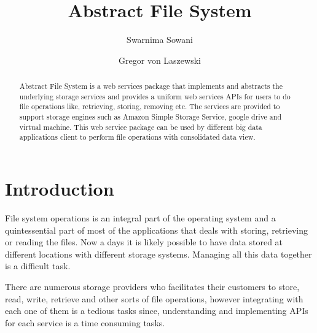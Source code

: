 
\title{Abstract File System}


\author{Swarnima Sowani}

\author{Gregor von Laszewski}


\renewcommand{\shortauthors}{G. v. Laszewski}


\begin{abstract}
Abstract File System is a web services package that implements and abstracts
the underlying storage services and provides a uniform web services APIs for
users to do file operations like, retrieving, storing, removing  etc. The
services are provided to support storage engines such as Amazon Simple Storage
Service, google drive and virtual machine. This web service package can be
used by different big data applications client to perform file operations with
consolidated data view. 


\end{abstract}



\maketitle


\section{Introduction}


File system operations is an integral part of the operating system and a
quintessential part of most of the applications that deals with storing,
retrieving or reading the files. Now a days it is likely possible to have data
stored at different locations with different storage systems. Managing all this
data together is a difficult task.

There are numerous storage providers who facilitates their customers to store,
read, write, retrieve and other sorts of file operations, however integrating
with each one of them is a tedious tasks since, understanding and implementing
APIs for each service is a time consuming tasks.

